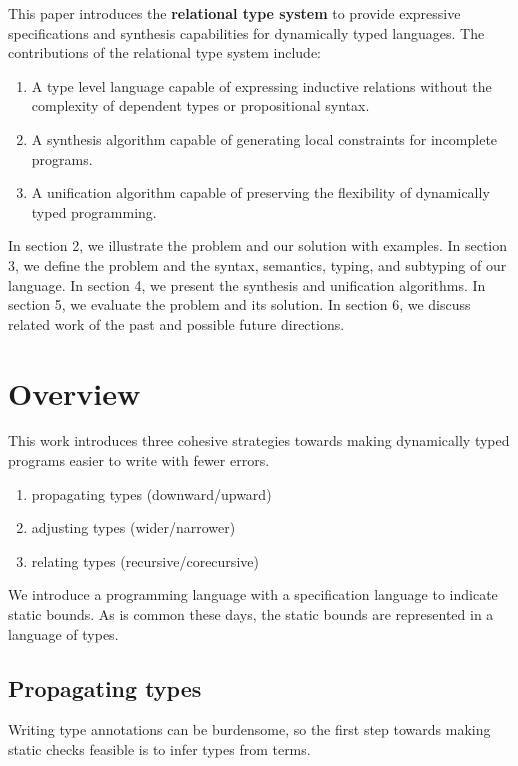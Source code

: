 \documentclass[sigplan,screen]{acmart}
\begin{document}
This paper introduces the \textbf{relational type system} to provide expressive specifications 
and synthesis capabilities for dynamically typed languages. 
The contributions of the relational type system include:
\begin{enumerate}
  \item A type level language capable of expressing inductive relations without the complexity of dependent types or propositional syntax.  
  \item A synthesis algorithm capable of generating local constraints for incomplete programs. 
  \item A unification algorithm capable of preserving the flexibility of dynamically typed programming. 
\end{enumerate}


In section 2, we illustrate the problem and our solution with examples.
In section 3, we define the problem and the syntax, semantics, typing, and subtyping of our language.
In section 4, we present the synthesis and unification algorithms.
In section 5, we evaluate the problem and its solution. 
In section 6, we discuss related work of the past and possible future directions. 

\section{Overview}

This work introduces three cohesive strategies towards making
dynamically typed programs easier to write with fewer errors.  
\begin{enumerate}
  \item propagating types (downward/upward) 
  \item adjusting types (wider/narrower) 
  \item relating types (recursive/corecursive) 
\end{enumerate}
We introduce a programming language with a specification language to indicate static bounds. 
As is common these days, the static bounds are represented in a language of types.

\subsection{Propagating types}
Writing type annotations can be burdensome, so the first step 
towards making static checks feasible is to infer types from terms.
\end{document}
